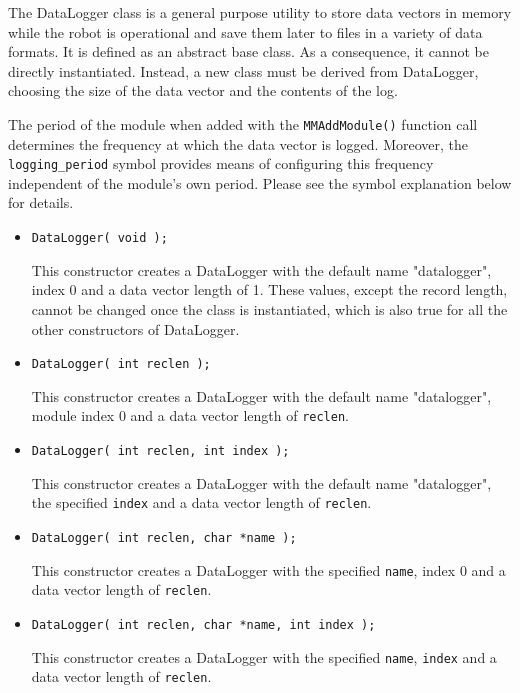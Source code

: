 The DataLogger class is a general purpose utility to store data vectors in
memory while the robot is operational and save them later to files in a
variety of data formats. It is defined as an abstract base class. As a
consequence, it cannot be directly instantiated. Instead, a new class must
be derived from DataLogger, choosing the size of the data vector and the
contents of the log.

The period of the module when added with the {\tt MMAddModule()} function
call determines the frequency at which the data vector is logged. Moreover,
the {\tt logging\_period} symbol provides means of configuring this frequency
independent of the module's own period. Please see the symbol explanation
below for details.

\constructors

\begin{itemize}
\item{\tt DataLogger( void );} \par

This constructor creates a DataLogger with the default name "datalogger",
index 0 and a data vector length of 1. These values, except the record
length, cannot be changed once the class is instantiated, which is also true
for all the other constructors of DataLogger.

\item{\tt DataLogger( int reclen );} \par

This constructor creates a DataLogger with the default name "datalogger",
module index 0 and a data vector length of {\tt reclen}. 

\item{\tt DataLogger( int reclen, int index );} \par

This constructor creates a DataLogger with the default name "datalogger",
the specified {\tt index} and a data vector length of {\tt reclen}.

\item{\tt DataLogger( int reclen, char *name );} \par

This constructor creates a DataLogger with the specified {\tt name},
index 0 and a data vector length of {\tt reclen}.

\item{\tt DataLogger( int reclen, char *name, int index );} \par

This constructor creates a DataLogger with the specified {\tt name},
{\tt index} and a data vector length of {\tt reclen}.

\end{itemize}


